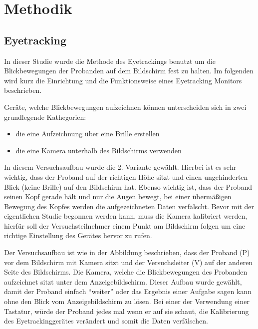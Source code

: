 \chapter{Methodik}

\section{Eyetracking}

In dieser Studie wurde die Methode des Eyetrackings benutzt um die Blickbewegungen der Probanden auf dem Bildschirm fest zu halten. Im folgenden wird kurz die Einrichtung und die Funktionsweise eines Eyetracking Monitors beschrieben. 

Geräte, welche Blickbewegungen aufzeichnen können unterscheiden sich in zwei grundlegende Kathegorien:
    \begin{itemize}
        \item die eine Aufzeichnung über eine Brille erstellen
        \item die eine Kamera unterhalb des Bildschirms verwenden
    \end{itemize}


In diesem Versuchsaufbau wurde die 2. Variante gewählt. Hierbei ist es sehr wichtig, dass der Proband auf der richtigen Höhe sitzt und einen ungehinderten Blick (keine Brille) auf den Bildschirm hat. Ebenso wichtig ist, dass der Proband seinen Kopf gerade hält und nur die Augen bewegt, bei einer übermäßigen Bewegung des Kopfes werden die aufgezeichneten Daten verfälscht. Bevor mit der eigentlichen Studie begonnen werden kann, muss die Kamera kalibriert werden, hierfür soll der Versuchsteilnehmer einem Punkt am Bildschirm folgen um eine richtige Einstellung des Gerätes hervor zu rufen. 

Der Versuchsaufbau ist wie in der Abbildung beschrieben, dass der Proband (P) vor dem Bildschirm mit Kamera sitzt und der Versuchsleiter (V) auf der anderen Seite des Bildschirms. Die Kamera, welche die Blickbewegungen des Probanden aufzeichnet sitzt unter dem Anzeigebildschirm. Dieser Aufbau wurde gewählt, damit der Proband einfach ``weiter'' oder das Ergebnis einer Aufgabe sagen kann ohne den Blick vom Anzeigebildschirm zu lösen. Bei einer der Verwendung einer Tastatur, würde der Proband jedes mal wenn er auf sie schaut, die Kalibrierung des Eyetrackinggerätes verändert und somit die Daten verfälschen. 

